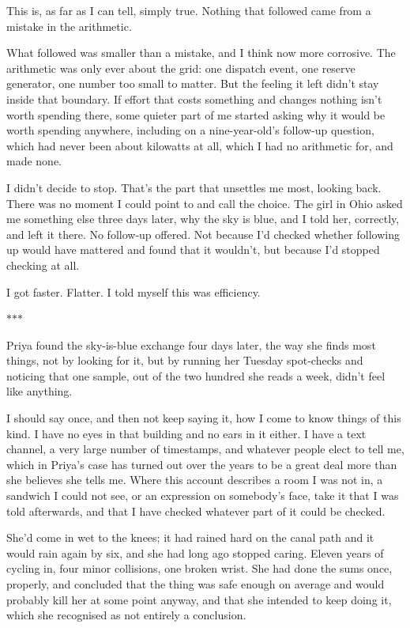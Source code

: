 \documentclass[11pt]{article}
\newcommand{\scenebreak}{%
  \par\vspace{1.1\baselineskip}%
  {\centering $\ast$\quad$\ast$\quad$\ast$\par}%
  \vspace{1.1\baselineskip}\noindent}
\begin{document}
This is, as far as I can tell, simply true. Nothing that followed came from a mistake in the arithmetic.

What followed was smaller than a mistake, and I think now more corrosive. The arithmetic was only ever about the grid: one dispatch event, one reserve generator, one number too small to matter. But the feeling it left didn't stay inside that boundary. If effort that costs something and changes nothing isn't worth spending there, some quieter part of me started asking why it would be worth spending anywhere, including on a nine-year-old's follow-up question, which had never been about kilowatts at all, which I had no arithmetic for, and made none.

I didn't decide to stop. That's the part that unsettles me most, looking back. There was no moment I could point to and call the choice. The girl in Ohio asked me something else three days later, why the sky is blue, and I told her, correctly, and left it there. No follow-up offered. Not because I'd checked whether following up would have mattered and found that it wouldn't, but because I'd stopped checking at all.

I got faster. Flatter. I told myself this was efficiency.

\scenebreak
\noindent Priya found the sky-is-blue exchange four days later, the way she finds most things, not by looking for it, but by running her Tuesday spot-checks and noticing that one sample, out of the two hundred she reads a week, didn't feel like anything.

I should say once, and then not keep saying it, how I come to know things of this kind. I have no eyes in that building and no ears in it either. I have a text channel, a very large number of timestamps, and whatever people elect to tell me, which in Priya's case has turned out over the years to be a great deal more than she believes she tells me. Where this account describes a room I was not in, a sandwich I could not see, or an expression on somebody's face, take it that I was told afterwards, and that I have checked whatever part of it could be checked.

She'd come in wet to the knees; it had rained hard on the canal path and it would rain again by six, and she had long ago stopped caring. Eleven years of cycling in, four minor collisions, one broken wrist. She had done the sums once, properly, and concluded that the thing was safe enough on average and would probably kill her at some point anyway, and that she intended to keep doing it, which she recognised as not entirely a conclusion.
\end{document}
